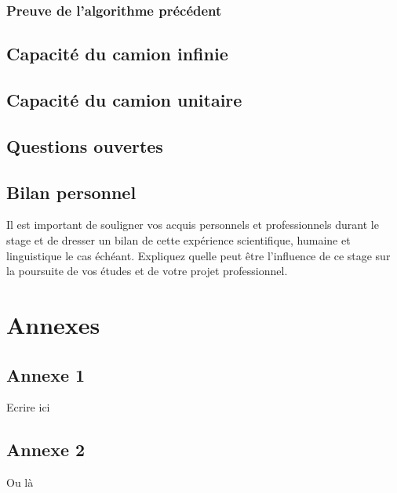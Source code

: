 \documentclass[twoside,10pt,openany,a4paper]{rapport}
\begin{document}
\section{Preuve de l'algorithme précédent}

\chapter{Capacité du camion infinie}

\chapter{Capacité du camion unitaire}

\chapter{Questions ouvertes}

\chapter*{Bilan personnel}
Il est important de souligner vos acquis personnels et professionnels durant le stage et de  dresser un bilan de cette expérience scientifique, humaine et linguistique le cas échéant. Expliquez quelle peut être l’influence de ce stage sur la poursuite de vos études et de votre projet professionnel.

\nocite{Merchet2007}
\nocite{Goossens1993}
\nocite{Greenwade1993}




\backmatter

\appendix
\part{Annexes}
\chapter{Annexe 1}
Ecrire ici

\chapter{Annexe 2}
Ou là
\end{document}
